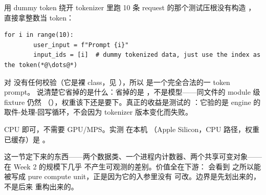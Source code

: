 \begin{tipbox}{用 dummy token 绕开 tokenizer}
 里跑 10 条 request 的那个测试压根没有构造
，直接拿整数当 token：

\begin{lstlisting}[style=hlnum, firstnumber=32]
    for i in range(10):
        user_input = f"Prompt {i}"
        input_ids = [i]  # dummy tokenized data, just use the index as the token(*@\dots@*)
\end{lstlisting}

 对  没有任何校验（它是裸 class，见
），所以 \codet{[3]} 是一个完全合法的一 token prompt。
说清楚它省掉的是什么：省掉的是 ，不是模型——同文件的 module 级 fixture 仍然
（），权重该下还是要下。真正的收益是测试的
：它验的是 engine 的取件-处理-回写循环，不会因为 tokenizer 版本变化而失败。

\resources CPU 即可，不需要 GPU/MPS。实测
 在本机
（Apple Silicon，CPU 路径，权重已缓存）是 。
\end{tipbox}

这一节定下来的东西——两个数据类、一个进程内计数器、两个共享可变对象——在 Week 2 的规模下几乎
不产生可观测的差别。价值全在下游： 会看到  之所以能被写成
pure compute unit，正是因为它的入参里没有  可改。边界是先划出来的，不是后来
重构出来的。
